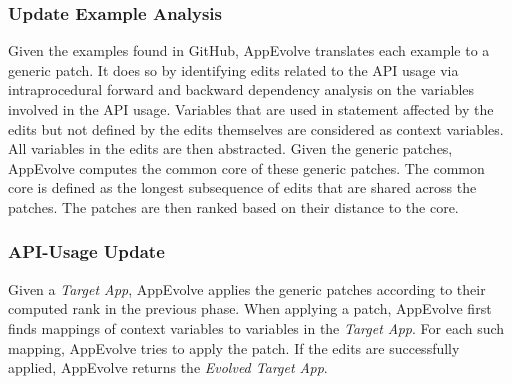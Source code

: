 \subsubsection{Update Example Analysis}
Given the examples found in GitHub, AppEvolve translates each example to a generic patch. It does so by identifying edits related to the API usage via intraprocedural forward and backward dependency analysis on the variables involved in the API usage. Variables that are used in statement affected by the edits but not defined by the edits themselves are considered as context variables. All variables in the edits are then abstracted. Given the generic patches, AppEvolve computes  the common core of these generic patches. The common core is defined as the longest subsequence of edits that are shared across the patches. The patches are then ranked based on their distance to the core.

\subsubsection{API-Usage Update}
Given a {\em Target App}, AppEvolve applies the generic patches according to their computed rank in the previous phase. When applying a patch, AppEvolve first finds mappings of context variables to variables in the {\em Target App}. For each such mapping, AppEvolve tries to apply the patch. If the edits are successfully applied, AppEvolve returns the {\em Evolved Target App}.

%

